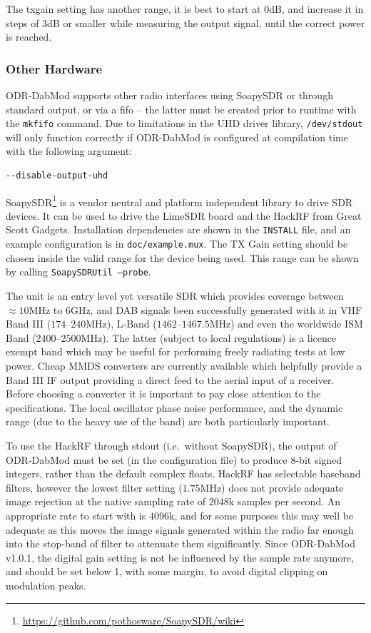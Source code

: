 The txgain setting has another range, it is best to start at $0$dB, and increase
it in steps of $3$dB or smaller while measuring the output signal, until the
correct power is reached.

\subsubsection{Other Hardware}
\label{otherhardware}
ODR-DabMod supports other radio interfaces using SoapySDR or through standard output, or via
a fifo -- the latter must be created prior to runtime with the \texttt{mkfifo} command.
Due to limitations in the UHD driver library, \texttt{/dev/stdout} will only
function correctly if ODR-DabMod is configured at compilation time with the
following argument:

\begin{lstlisting}
--disable-output-uhd
\end{lstlisting}

SoapySDR\footnote{\url{https://github.com/pothosware/SoapySDR/wiki}} is a vendor
neutral and platform independent library to drive SDR devices. It can be used to
drive the LimeSDR board and the HackRF from Great Scott Gadgets. Installation
dependencies are shown in the \texttt{INSTALL} file, and an example
configuration is in \texttt{doc/example.mux}. The TX Gain setting should be
chosen inside the valid range for the device being used. This range can be shown
by calling \texttt{SoapySDRUtil --probe}.

The unit is an entry level yet versatile SDR which provides coverage between
$\approx10$MHz to $6$GHz, and DAB signals been successfully generated with it in
VHF Band III ($174$--$240$MHz), L-Band ($1462$--$1467.5$MHz) and even the worldwide ISM
Band ($2400$--$2500$MHz). The latter (subject to local regulations) is a licence exempt
band which may be useful for performing freely radiating tests at low power. Cheap
MMDS converters are currently available which helpfully provide a Band III IF output
providing a direct feed to the aerial input of a receiver. Before choosing a converter
it is important to pay close attention to the specifications. The local oscillator
phase noise performance, and the dynamic range (due to the heavy use of the band) are
both particularly important.

To use the HackRF through stdout (i.e.\ without SoapySDR),
the output of ODR-DabMod must be set (in the configuration file) to
produce 8-bit signed integers, rather than the default complex floats.
HackRF has selectable baseband filters, however the lowest filter setting
($1.75$MHz) does not provide adequate image rejection at the native sampling rate of
$2048$k samples per second. An appropriate rate to start with is $4096$k, and for
some purposes this may well be adequate as this moves the image signals
generated within the radio far enough into the stop-band of filter to attenuate
them significantly. Since ODR-DabMod v1.0.1, the digital gain setting is not
be influenced by the sample rate anymore, and should be set below 1, with some
margin, to avoid digital clipping on modulation peaks.

